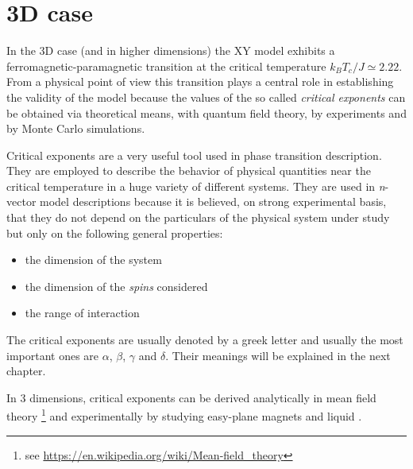 \section{3D case}

In the 3D case (and in higher dimensions) the XY model exhibits a 
ferromagnetic-paramagnetic transition at the critical temperature $k_B T_c / J 
\simeq 2.22$. From a physical point of view this transition plays a central role in
establishing the validity of the model because the values of the so called 
\emph{critical exponents} can be obtained via theoretical means, with quantum
field theory, by experiments and by Monte Carlo simulations.

Critical exponents are a very useful tool used in phase transition description.
They are employed to describe the behavior of physical quantities near the critical
temperature in a huge variety of different systems. They are used in 
\textit{n}-vector model descriptions because it is believed, on strong experimental 
basis, that they do not depend on the particulars of the physical system under
study but only on the following general properties:
\begin{itemize}
  \item the dimension of the system
  \item the dimension of the \emph{spins} considered
  \item the range of interaction
\end{itemize}

The critical exponents are usually denoted by a greek letter and usually the most
important ones are $\alpha$, $\beta$, $\gamma$ and $\delta$. Their meanings will
be explained in the next chapter. 
 
In 3 dimensions, critical exponents can be derived analytically in mean field
theory \footnote{see \url{https://en.wikipedia.org/wiki/Mean-field_theory}}
and experimentally by studying easy-plane magnets and liquid .

